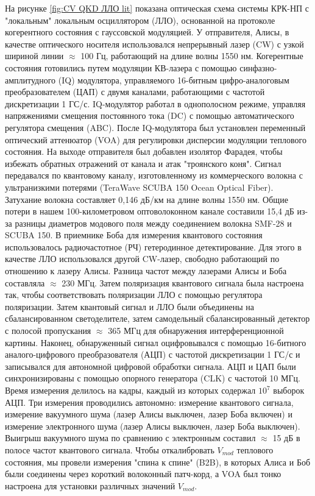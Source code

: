 На рисунке \ref{fig:CV QKD ЛЛО lit} показана оптическая схема  системы КРК-НП с "локальным" локальным осциллятором (ЛЛО), основанной на протоколе когерентного состояния с гауссовской модуляцией. У отправителя, Алисы, в качестве оптического носителя использовался непрерывный лазер (CW) с узкой шириной линии $\approx$ 100 Гц, работающий на длине волны 1550 нм. Когерентные состояния готовились путем модуляции КВ-лазера с помощью синфазно-амплитудного (IQ) модулятора, управляемого 16-битным цифро-аналоговым преобразователем (ЦАП) с двумя каналами, работающими с частотой дискретизации 1 ГС/с. IQ-модулятор работал в однополосном режиме, управляя напряжениями смещения постоянного тока (DC) с помощью автоматического регулятора смещения (ABC). После IQ-модулятора был установлен переменный оптический аттенюатор (VOA) для регулировки дисперсии модуляции теплового состояния. На выходе отправителя был добавлен изолятор Фарадея, чтобы избежать обратных отражений от канала и атак "троянского коня". Сигнал передавался по квантовому каналу, изготовленному из коммерческого волокна с ультранизкими потерями (TeraWave SCUBA 150 Ocean Optical Fiber). Затухание волокна составляет 0,146 дБ/км на длине волны 1550 нм. Общие потери в нашем 100-километровом оптоволоконном канале составили 15,4 дБ из-за разницы диаметров модового поля между соединением волокна SMF-28 и SCUBA 150.
В приемнике Боба для измерения квантового состояния использовалось радиочастотное (РЧ) гетеродинное детектирование. Для этого в качестве ЛЛО использовался другой CW-лазер, свободно работающий по отношению к лазеру Алисы. Разница частот между
лазерами Алисы и Боба составляла $\approx$ 230 МГц. Затем поляризация квантового сигнала была настроена так, чтобы соответствовать поляризации ЛЛО с помощью регулятора поляризации. Затем квантовый сигнал и ЛЛО были объединены на сбалансированном светоделителе,
затем самодельный сбалансированный детектор с полосой пропускания
$\approx$ 365 МГц для обнаружения интерференционной картины. Наконец, обнаруженный сигнал оцифровывался с помощью 16-битного аналого-цифрового преобразователя (АЦП) с частотой дискретизации 1 ГС/с и записывался для автономной цифровой обработки сигнала. АЦП и ЦАП были синхронизированы с помощью опорного генератора (CLK) с частотой 10 МГц.
Время измерения делилось на кадры, каждый из которых содержал $10^7$ выборок АЦП. Три измерения проводились автономно: измерение квантового сигнала, измерение вакуумного шума (лазер Алисы выключен, лазер Боба включен) и измерение электронного шума (лазер Алисы выключен, лазер Боба выключен). Выигрыш вакуумного шума по сравнению с электронным составил $\approx$ 15 дБ в полосе частот квантового сигнала. Чтобы откалибровать $V_{mod}$ теплового состояния, мы провели измерения "спина к спине" (B2B), в которых Алиса и Боб были соединены через короткий волоконный патч-корд, а VOA был тонко настроена для установки различных значений $V_{mod}$.
